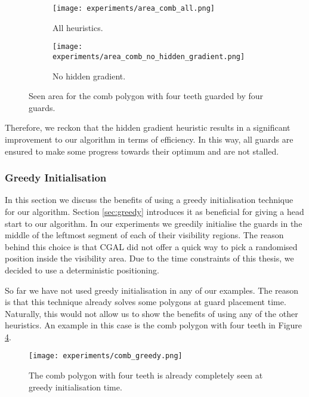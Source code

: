 \begin{figure}[h!]
    \centering
    \begin{subfigure}{0.45\textwidth}
        \texttt{[image: experiments/area\_comb\_all.png]}
        \caption{All heuristics.}
        \label{fig:area_comb_all2}
    \end{subfigure}
    \begin{subfigure}{0.45\textwidth}
        \texttt{[image: experiments/area\_comb\_no\_hidden\_gradient.png]}
        \caption{No hidden gradient.}
        \label{fig:area_comb_no_hidden_gradient}
    \end{subfigure}
    \caption{Seen area for the comb polygon with four teeth guarded by four guards.}
    \label{fig:area_no_hidden_gradient}
\end{figure}

Therefore, we reckon that the hidden gradient heuristic results in a significant improvement to our algorithm in terms of efficiency. In this way, all guards are ensured to make some progress towards their optimum and are not stalled.

\subsubsection{Greedy Initialisation}
In this section we  discuss the benefits of using a greedy initialisation technique for our algorithm. Section \ref{sec:greedy} introduces it as beneficial for giving a head start to our algorithm. In our experiments we  greedily initialise the guards in the middle of the leftmost segment of each of their visibility regions. The reason behind this choice is that CGAL did not offer a quick way to pick a randomised position inside the visibility area. Due to the time constraints of this thesis, we decided to use a deterministic positioning.

So far we have not used greedy initialisation in any of our examples. The reason is that this technique already solves some polygons at guard placement time. Naturally, this would not allow us to show the benefits of using any of the other heuristics. An example in this case is the comb polygon with four teeth in Figure \ref{fig:comb_greedy}.

\begin{figure}[h!]
    \centering
    \texttt{[image: experiments/comb\_greedy.png]}
    \caption{The comb polygon with four teeth is already completely seen at greedy initialisation time.}
    \label{fig:comb_greedy}
\end{figure}


